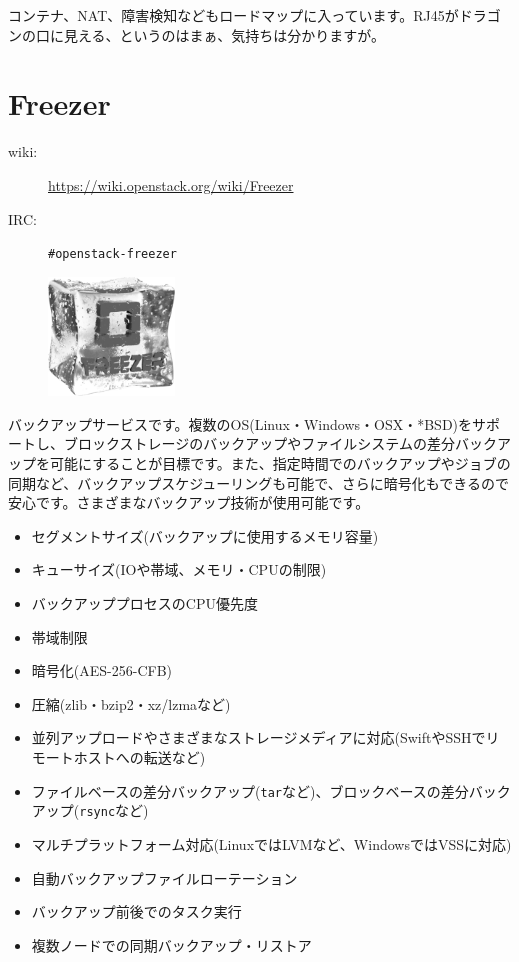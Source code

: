 コンテナ、NAT、障害検知などもロードマップに入っています。RJ45がドラゴンの口に見える、というのはまぁ、気持ちは分かりますが。

\section{Freezer}

\begin{description}
	\item[wiki:] \url{https://wiki.openstack.org/wiki/Freezer}
	\item[IRC:] \verb|#openstack-freezer|
\end{description}

\begin{figure}
	\vspace*{-2\intextsep}
	\begin{center}
		\includegraphics[width=0.3\textwidth]{img/freezer_logo.png}
	\end{center}
\end{figure}

バックアップサービスです。複数のOS(Linux・Windows・OSX・*BSD)をサポートし、ブロックストレージのバックアップやファイルシステムの差分バックアップを可能にすることが目標です。また、指定時間でのバックアップやジョブの同期など、バックアップスケジューリングも可能で、さらに暗号化もできるので安心です。さまざまなバックアップ技術が使用可能です。

\begin{itemize}
	\item セグメントサイズ(バックアップに使用するメモリ容量)
	\item キューサイズ(IOや帯域、メモリ・CPUの制限)
	\item バックアッププロセスのCPU優先度
	\item 帯域制限
	\item 暗号化(AES-256-CFB)
	\item 圧縮(zlib・bzip2・xz/lzmaなど)
	\item 並列アップロードやさまざまなストレージメディアに対応(SwiftやSSHでリモートホストへの転送など)
	\item ファイルベースの差分バックアップ(\verb|tar|など)、ブロックベースの差分バックアップ(\verb|rsync|など)
	\item マルチプラットフォーム対応(LinuxではLVMなど、WindowsではVSSに対応)
	\item 自動バックアップファイルローテーション
	\item バックアップ前後でのタスク実行
	\item 複数ノードでの同期バックアップ・リストア
\end{itemize}

